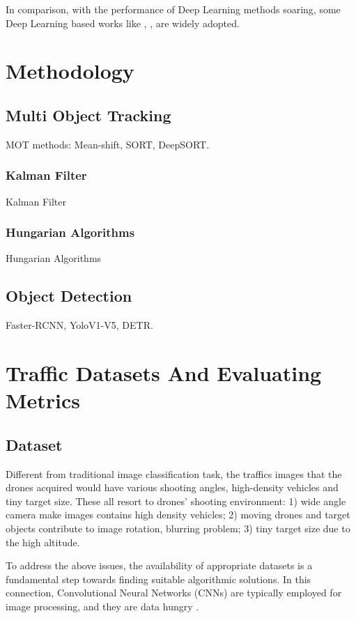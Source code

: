 \documentclass[10pt,twocolumn,letterpaper]{article}  %
\begin{document}
In comparison, with the performance of Deep Learning methods soaring, some Deep Learning based works like \cite{li2019simultaneously}, \cite{zhu2018urban}, \cite{micheal2019automatic} are widely adopted.




\section{Methodology}
\subsection{Multi Object Tracking}
MOT methods: Mean-shift, SORT, DeepSORT.
\subsubsection{Kalman Filter}
Kalman Filter
\subsubsection{Hungarian Algorithms}
Hungarian Algorithms

\subsection{Object Detection}
Faster-RCNN, YoloV1-V5, DETR.


\section{Traffic Datasets And Evaluating Metrics}
\subsection{Dataset}
Different from traditional image classification task, the traffics images that the drones acquired would have various shooting angles, high-density vehicles and tiny target size. These all resort to drones' shooting environment: 1)  wide angle camera make images contains high density vehicles; 2) moving drones and target objects contribute to image rotation, blurring problem; 3) tiny target size due to the high altitude.

To address the above issues, the availability of appropriate
datasets is a fundamental step towards finding suitable algorithmic solutions. In this connection, Convolutional Neural Networks (CNNs) are typically employed for image processing, and they are data hungry \cite{waqas2019isaid}.
\end{document}
